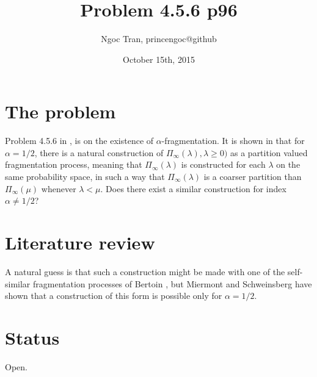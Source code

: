 \documentclass[12pt]{amsart}
\title{Problem 4.5.6 p96} %
\author{Ngoc Tran, princengoc@github} %
\date{October 15th, 2015} %
\theoremstyle{plain}
\begin{document}
\maketitle

\section{The problem} 
Problem 4.5.6 in \cite[page 96]{MR2245368}, is on the existence of $\alpha$-fragmentation. 
It is shown in \cite[Chapter 9]{MR2245368} that for $\alpha = 1/2$, there is a natural construction of $\Pi_\infty(\lambda), \lambda \geq 0)$ as a partition valued fragmentation process, meaning that $\Pi_\infty(\lambda)$ is constructed for each $\lambda$ on the same probability space, in such a way that $\Pi_\infty(\lambda)$ is a coarser partition than $\Pi_\infty(\mu)$ whenever $\lambda < \mu$. Does there exist a similar construction for index $\alpha \neq 1/2$? 

\section{Literature review} %
A natural guess is that
such a construction might be made with one of the self-similar fragmentation
processes of Bertoin \cite{MR1899456}, but Miermont and Schweinsberg \cite{MR2053052} have shown that
a construction of this form is possible only for $\alpha = 1/2$. 

\section{Status} %
Open.


\end{document}
